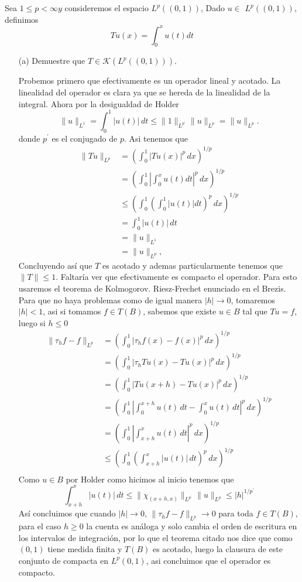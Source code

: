 Sea $1 \leq p<\infty y$ consideremos el espacio $L^p((0,1))$, Dado $u \in$ $L^p((0,1))$, definimos
$$
T u(x)=\int_0^x u(t) d t
$$
\begin{itemize}
    \item[(a)] Demuestre que $T \in \mathcal{K}\left(L^p((0,1))\right)$.
    \begin{sproof}
        Probemos primero que efectivamente es un operador lineal y acotado. La linealidad del  operador es clara ya que se hereda de la linealidad de la integral. Ahora  por la desigualdad de Holder
        $$\|u\|_{L^1}=\int_0^1|u(t)|\,dt\leq \|1\|_{L^{p^\prime}}\|u\|_{L^p}=\|u\|_{L^p}.$$
        donde $p^\prime$ es el conjugado de $p.$ Asi tenemos que
        \begin{align*}
            \|Tu\|_{L^p}&=\left(\int_0^1|Tu(x)|^p\,dx\right)^{1/p}\\
            &=\left(\int_0^1\left|\int_0^xu(t)dt\right|^p\,dx\right)^{1/p}\\
            &\leq\left(\int_0^1\left(\int_0^1|u(t)|dt\right)^p\,dx\right)^{1/p}\\
            &=\int_0^1|u(t)|\,dt\\
            &=\|u\|_{L^1}\\
            &=\|u\|_{L^p},
        \end{align*}
        Concluyendo así que $T$ es acotado y ademas particularmente tenemos que $\|T\|\leq 1.$ Faltaría ver que efectivamente es compacto el operador. Para esto usaremos el teorema de Kolmogorov. Riesz-Frechet enunciado en el Brezis. Para que no haya problemas como de igual manera $|h|\to 0$, tomaremos $|h|<1$, asi si tomamos $f\in T(B)$, sabemos que existe $u\in B$ tal que $Tu=f$, luego si $h\leq 0$
        \begin{align*}
            \|\tau_hf-f\|_{L^p}&=\left(\int_0^1|\tau_hf(x)-f(x)|^p\,dx\right)^{1/p}\\
            &=\left(\int_0^1|\tau_hTu(x)-Tu(x)|^p\,dx\right)^{1/p}\\
            &=\left(\int_0^1|Tu(x+h)-Tu(x)|^p\,dx\right)^{1/p}\\
            &=\left(\int_0^1\left|\int_0^{x+h}u(t)\,dt-\int_0^xu(t)\,dt\right|^p\,dx\right)^{1/p}\\
            &=\left(\int_0^1\left|\int_{x+h}^{x}u(t)\,dt\right|^p\,dx\right)^{1/p}\\
            &\leq \left(\int_0^1\left(\int_{x+h}^{x}|u(t)|\,dt\right)^p\,dx\right)^{1/p}\\
        \end{align*}
        Como $u\in B$ por Holder como hicimos al inicio tenemos que
        $$\int_{x+h}^x|u(t)|\,dt\leq \| \chi_{(x+h,x)} \|_{L^{p^\prime}}\|u\|_{L^p}\leq |h|^{1/p^\prime}$$
        Así concluimos que cuando $|h|\to 0$, $\|\tau_hf-f\|_{L^p}\to 0$ para toda $f\in T(B)$, para el caso $h\geq 0$ la cuenta es análoga y solo cambia el orden de escritura en los intervalos de integración, por lo que el teorema citado nos dice que como $(0,1)$ tiene medida finita y $T(B)$ es acotado, luego la clausura de este conjunto de compacta en $L^p(0,1)$, asi concluimos que el operador es compacto.
        

\end{sproof}
\end{itemize}
